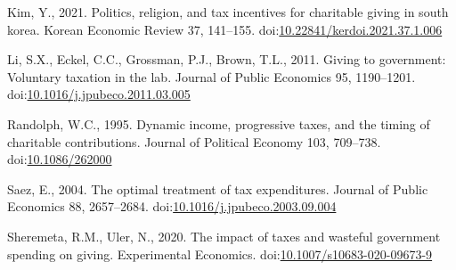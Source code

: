 \documentclass[ review  , 3p ]{elsarticle}
\newlength{\cslhangindent}
\newenvironment{CSLReferences}[2] %
 {%
  \setlength{\parindent}{0pt}
  \ifodd #1 \everypar{\setlength{\hangindent}{\cslhangindent}}\ignorespaces\fi
  \ifnum #2 > 0
  \setlength{\parskip}{#2\baselineskip}
  \fi
 }%
 {}
\begin{document}
\begin{CSLReferences}{1}{0}
  \leavevmode{}%
  Kim, Y., 2021. Politics, religion, and tax incentives for charitable giving in south korea. Korean Economic Review 37, 141--155. doi:\href{https://doi.org/10.22841/kerdoi.2021.37.1.006}{10.22841/kerdoi.2021.37.1.006}

  \leavevmode{}%
  Li, S.X., Eckel, C.C., Grossman, P.J., Brown, T.L., 2011. Giving to government: Voluntary taxation in the lab. Journal of Public Economics 95, 1190--1201. doi:\href{https://doi.org/10.1016/j.jpubeco.2011.03.005}{10.1016/j.jpubeco.2011.03.005}

  \leavevmode{}%
  Randolph, W.C., 1995. Dynamic income, progressive taxes, and the timing of charitable contributions. Journal of Political Economy 103, 709--738. doi:\href{https://doi.org/10.1086/262000}{10.1086/262000}

  \leavevmode{}%
  Saez, E., 2004. The optimal treatment of tax expenditures. Journal of Public Economics 88, 2657--2684. doi:\href{https://doi.org/10.1016/j.jpubeco.2003.09.004}{10.1016/j.jpubeco.2003.09.004}

  \leavevmode{}%
  Sheremeta, R.M., Uler, N., 2020. The impact of taxes and wasteful government spending on giving. Experimental Economics. doi:\href{https://doi.org/10.1007/s10683-020-09673-9}{10.1007/s10683-020-09673-9}

  \end{CSLReferences}
\end{document}
